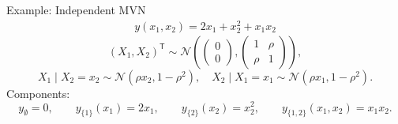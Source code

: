 \begin{frame}{Example: Independent MVN} %
  \begin{align*}
    y(x_1, x_2) = 2x_1 + x_2^{2} + x_1 x_2
  \end{align*}
\[
(X_1, X_2)^\mathsf{T} \sim \mathcal{N}\!\left(
\begin{pmatrix}0 \\ 0\end{pmatrix},
\begin{pmatrix}
1 & \rho \\ 
\rho & 1
\end{pmatrix}
\right),
\]
\[
X_1 \mid X_2=x_2 \sim \mathcal{N}(\rho x_2, 1-\rho^2), \quad
X_2 \mid X_1=x_1 \sim \mathcal{N}(\rho x_1, 1-\rho^2).
\]
Components:
\begin{equation*}
    y_{\emptyset} = 0, \qquad
    y_{\{1\}}(x_1) = 2x_1, \qquad
    y_{\{2\}}(x_2) = x_2^{2}, \qquad
    y_{\{1,2\}}(x_1, x_2) = x_1 x_2.
\end{equation*}
\end{frame}


